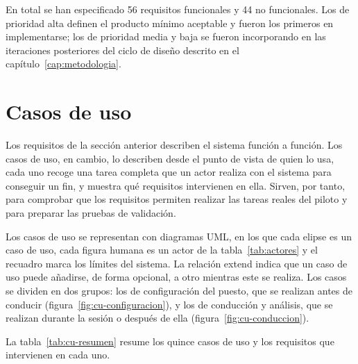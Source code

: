 En total se han especificado 56 requisitos funcionales y 44 no funcionales. Los de prioridad alta definen el producto mínimo aceptable y fueron los primeros en implementarse; los de prioridad media y baja se fueron incorporando en las iteraciones posteriores del ciclo de diseño descrito en el capítulo~\ref{cap:metodologia}.

\section{Casos de uso}
\label{sec:casos-uso}

Los requisitos de la sección anterior describen el sistema función a función. Los casos de uso, en cambio, lo describen desde el punto de vista de quien lo usa, cada uno recoge una tarea completa que un actor realiza con el sistema para conseguir un fin, y muestra qué requisitos intervienen en ella. Sirven, por tanto, para comprobar que los requisitos permiten realizar las tareas reales del piloto y para preparar las pruebas de validación.

Los casos de uso se representan con diagramas UML, en los que cada elipse es un caso de uso, cada figura humana es un actor de la tabla~\ref{tab:actores} y el recuadro marca los límites del sistema. La relación \guillemotleft extend\guillemotright{} indica que un caso de uso puede añadirse, de forma opcional, a otro mientras este se realiza. Los casos se dividen en dos grupos: los de configuración del puesto, que se realizan antes de conducir (figura~\ref{fig:cu-configuracion}), y los de conducción y análisis, que se realizan durante la sesión o después de ella (figura~\ref{fig:cu-conduccion}).



La tabla~\ref{tab:cu-resumen} resume los quince casos de uso y los requisitos que intervienen en cada uno.

